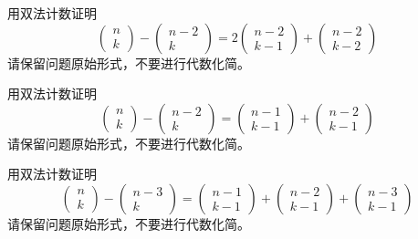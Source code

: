 \begin{exercise}
    用双法计数证明
    \[\begin{pmatrix}n\\k\end{pmatrix}-\begin{pmatrix}n-2\\k\end{pmatrix} = 2\begin{pmatrix}n-2\\k-1\end{pmatrix}+\begin{pmatrix}n-2\\k-2\end{pmatrix}\]
    请保留问题原始形式，不要进行代数化简。
\end{exercise}

\begin{exercise}
    用双法计数证明
    \[\begin{pmatrix}n\\k\end{pmatrix}-\begin{pmatrix}n-2\\k\end{pmatrix} = \begin{pmatrix}n-1\\k-1\end{pmatrix}+\begin{pmatrix}n-2\\k-1\end{pmatrix}\]
    请保留问题原始形式，不要进行代数化简。
\end{exercise}

\begin{exercise}
    用双法计数证明
    \[\begin{pmatrix}n\\k\end{pmatrix}-\begin{pmatrix}n-3\\k\end{pmatrix} = \begin{pmatrix}n-1\\k-1\end{pmatrix}+\begin{pmatrix}n-2\\k-1\end{pmatrix}+\begin{pmatrix}n-3\\k-1\end{pmatrix}\]
    请保留问题原始形式，不要进行代数化简。
\end{exercise}

